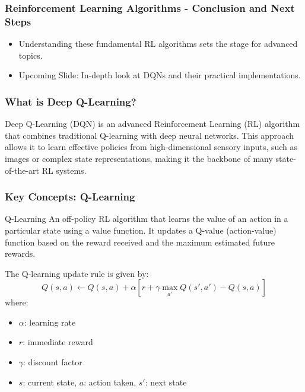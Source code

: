 \documentclass[aspectratio=169]{beamer}
\begin{document}
\begin{frame}[fragile]
    \frametitle{Reinforcement Learning Algorithms - Conclusion and Next Steps}
    
    \begin{itemize}
        \item Understanding these fundamental RL algorithms sets the stage for advanced topics.
        \item Upcoming Slide: In-depth look at DQNs and their practical implementations.
    \end{itemize}

\end{frame}

\begin{frame}[fragile]
    \frametitle{What is Deep Q-Learning?}
    Deep Q-Learning (DQN) is an advanced Reinforcement Learning (RL) algorithm that combines traditional Q-learning with deep neural networks. 
    This approach allows it to learn effective policies from high-dimensional sensory inputs, such as images or complex state representations, 
    making it the backbone of many state-of-the-art RL systems.
\end{frame}

\begin{frame}[fragile]
    \frametitle{Key Concepts: Q-Learning}
    \begin{block}{Q-Learning}
        An off-policy RL algorithm that learns the value of an action in a particular state using a value function. 
        It updates a Q-value (action-value) function based on the reward received and the maximum estimated future rewards. 
        
        The Q-learning update rule is given by:
        \begin{equation}
            Q(s, a) \leftarrow Q(s, a) + \alpha \left[ r + \gamma \max_{a'} Q(s', a') - Q(s, a) \right]
        \end{equation}
        where:
        \begin{itemize}
            \item $\alpha$: learning rate
            \item $r$: immediate reward
            \item $\gamma$: discount factor
            \item $s$: current state, $a$: action taken, $s'$: next state
        \end{itemize}
    \end{block}
\end{frame}
\end{document}
